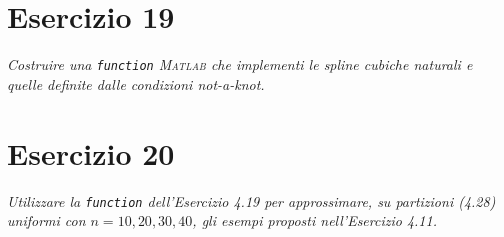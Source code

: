 
\section{Esercizio 19}
\label{sub:Esercizio 19}
\emph{Costruire una \lstinline{function} \textsc{Matlab} che implementi le spline cubiche naturali e quelle definite dalle condizioni not-a-knot.
}
\begin{sol}
	
\end{sol}

\section{Esercizio 20}
\label{sub:Esercizio 20}
\emph{Utilizzare la \lstinline{function} dell'Esercizio 4.19 per approssimare,
su partizioni (4.28) uniformi con $n=10,20,30,40$, gli esempi proposti nell'Esercizio 4.11.}

